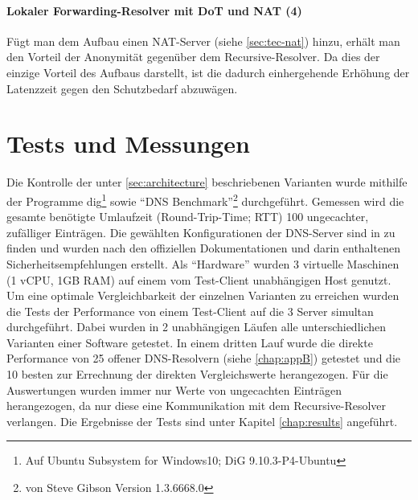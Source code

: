 \paragraph{Lokaler Forwarding-Resolver mit DoT und NAT (4)}
Fügt man dem Aufbau einen NAT-Server (siehe \ref{sec:tec-nat}) hinzu, erhält man den Vorteil der Anonymität gegenüber dem Recursive-Resolver. Da dies der einzige Vorteil des Aufbaus darstellt, ist die dadurch einhergehende Erhöhung der Latenzzeit gegen den Schutzbedarf abzuwägen.

\section{Tests und Messungen}
\label{sec:measurements}
Die Kontrolle der unter \ref{sec:architecture} beschriebenen Varianten wurde mithilfe der Programme dig\footnote{Auf Ubuntu Subsystem for Windows10; DiG 9.10.3-P4-Ubuntu} sowie ``DNS Benchmark''\footnote{von Steve Gibson Version 1.3.6668.0} durchgeführt. Gemessen wird die gesamte benötigte Umlaufzeit (Round-Trip-Time; RTT) 100 ungecachter, zufälliger Einträgen. Die gewählten Konfigurationen der DNS-Server sind in  zu finden und wurden nach den offiziellen Dokumentationen und darin enthaltenen Sicherheitsempfehlungen erstellt. Als ``Hardware'' wurden 3 virtuelle Maschinen (1 vCPU, 1GB RAM) auf einem vom Test-Client unabhängigen Host genutzt. Um eine optimale Vergleichbarkeit der einzelnen Varianten zu erreichen wurden die Tests der Performance von einem Test-Client auf die 3 Server simultan durchgeführt. Dabei wurden in 2 unabhängigen Läufen alle unterschiedlichen Varianten einer Software getestet. In einem dritten Lauf wurde die direkte Performance von 25 offener DNS-Resolvern (siehe \ref{chap:appB}) getestet und die 10 besten zur Errechnung der direkten Vergleichswerte herangezogen. Für die Auswertungen wurden immer nur Werte von ungecachten Einträgen herangezogen, da nur diese eine Kommunikation mit dem Recursive-Resolver verlangen. Die Ergebnisse der Tests sind unter Kapitel \ref{chap:results} angeführt. 

